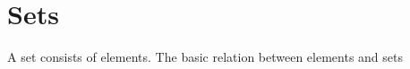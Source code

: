 \section{Sets}\label{sec:sets}

A set consists of elements. The basic relation between elements and sets
